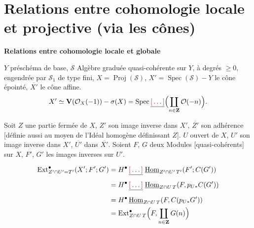 \documentclass[11pt,a4paper]{article}
\begin{document}
\section{Relations entre cohomologie locale et projective (via les cônes)}

\textbf{Relations entre cohomologie locale et globale}

$Y$ préschéma de base, $\mathcal{S}$ Algèbre graduée quasi-cohérente sur $Y$,
à degrés $\geqslant 0$, engendrée par $\mathcal{S}_1$ de type fini,
$X = \operatorname{Proj}(\mathcal{S})$, $X' = \operatorname{Spec}(\mathcal{S})
- Y$ le cône épointé, $\overline{X'}$ le cône affine.
\[
  X' \simeq \mathbf{V}(\mathcal{O}_X(-1)) - \sigma(X)
  = \operatorname{Spec} \struck{\ill{}} \Bigl(\coprod_{n \in \mathbf{Z}}
  \mathcal{O}(-n)\Bigr).
\]

Soit $Z$ une partie fermée de $X$, $Z'$ son image inverse dans $X'$,
$\overline{Z'}$ son adhérence [définie aussi au moyen de l'Idéal homogène
définissant $Z$]. $U$ ouvert de $X$, $U'$ son image
inverse dans $X'$, $\overline{U'}$ dans $\overline{X'}$. Soient $F$, $G$ deux
Modules [quasi-cohérents] sur  $X$, $F'$, $G'$ les
images inverses sur $U'$.

\[
\begin{aligned}
  \operatorname{Ext}^{\bullet}_{Z' \cap U' = T'}(X'; F'; G')
  &= H^{\bullet}\, \struck{\ill{}}\; \underline{\operatorname{Hom}}_{Z' \cap U'\,
  T'}(F'; C(G'))\\
  &= H^{\bullet}\, \struck{\ill{}}\; \underline{\operatorname{Hom}}_{Z \cap U\,
  T}(F, p_{U*} C(G'))\\
  &= H^{\bullet}\, \underline{\operatorname{Hom}}_{Z \cap U\, T}(F,
  C(p_{U*} G'))\\
  &= \operatorname{Ext}^{\bullet}_{Z \cap U\, T}\Bigl(F, \coprod_{n \in
  \mathbf{Z}} G(n)\Bigr)
\end{aligned}
\]
\end{document}
